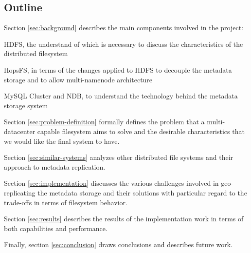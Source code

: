 \subsection{Outline}
Section \ref{sec:background} describes the main components involved in the project:
\begin{inparaenum}
\item HDFS, the understand of which is necessary to discuss the characteristics of the distributed filesystem
\item HopsFS, in terms of the changes applied to HDFS to decouple the metadata storage and to allow multi-namenode architecture
\item MySQL Cluster and NDB, to understand the technology behind the metadata storage system
\end{inparaenum}

Section \ref{sec:problem-definition} formally defines the problem that a multi-datacenter capable filesystem aims to solve and the desirable characteristics that we would like the final system to have.

Section \ref{sec:similar-systems} analyzes other distributed file systems and their approach to metadata replication.

Section \ref{sec:implementation} discusses the various challenges involved in geo-replicating the metadata storage and their solutions with particular regard to the trade-offs in terms of filesystem behavior.

Section \ref{sec:results} describes the results of the implementation work in terms of both capabilities and performance.

Finally, section \ref{sec:conclusion} draws conclusions and describes future work.